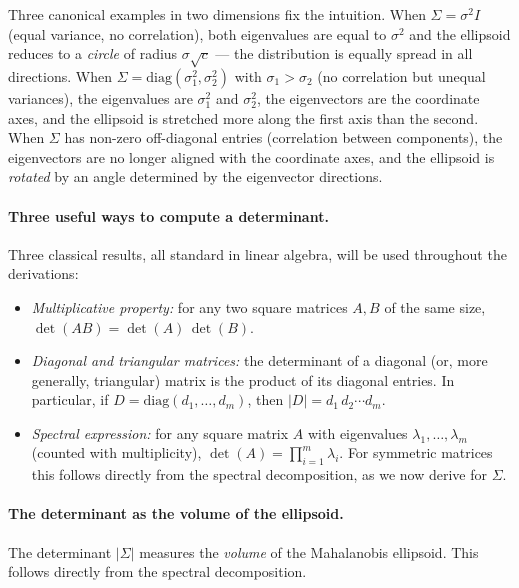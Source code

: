 \documentclass[11pt, a4paper, oneside]{article}
\begin{document}
Three canonical examples in two dimensions fix the intuition. When
$\Sigma = \sigma^{2} I$ (equal variance, no correlation), both
eigenvalues are equal to $\sigma^2$ and the ellipsoid reduces to a
\emph{circle} of radius $\sigma\sqrt{c}$ — the distribution is equally
spread in all directions. When $\Sigma = \mathrm{diag}(\sigma_1^{2}, \sigma_2^{2})$
with $\sigma_1 > \sigma_2$ (no correlation but unequal variances), the
eigenvalues are $\sigma_1^2$ and $\sigma_2^2$, the eigenvectors are the
coordinate axes, and the ellipsoid is stretched more along the first
axis than the second. When $\Sigma$ has non-zero off-diagonal entries
(correlation between components), the eigenvectors are no longer aligned
with the coordinate axes, and the ellipsoid is \emph{rotated} by an
angle determined by the eigenvector directions.

\paragraph{Three useful ways to compute a determinant.}
Three classical results, all standard in linear algebra, will be used
throughout the derivations:
\begin{itemize}[leftmargin=1.5em, itemsep=2pt]
    \item \emph{Multiplicative property:} for any two square matrices
          $A, B$ of the same size, $\det(AB) = \det(A)\,\det(B)$.
    \item \emph{Diagonal and triangular matrices:} the determinant of a
          diagonal (or, more generally, triangular) matrix is the
          product of its diagonal entries. In particular, if
          $D = \mathrm{diag}(d_1, \ldots, d_m)$, then
          $|D| = d_1\, d_2 \cdots d_m$.
    \item \emph{Spectral expression:} for any square matrix $A$ with
          eigenvalues $\lambda_1, \ldots, \lambda_m$ (counted with
          multiplicity), $\det(A) = \prod_{i=1}^m \lambda_i$. For
          symmetric matrices this follows directly from the spectral
          decomposition, as we now derive for $\Sigma$.
\end{itemize}


\paragraph{The determinant as the volume of the ellipsoid.}
The determinant $|\Sigma|$ measures the \emph{volume} of the Mahalanobis
ellipsoid. This follows directly from the spectral decomposition.
\end{document}
